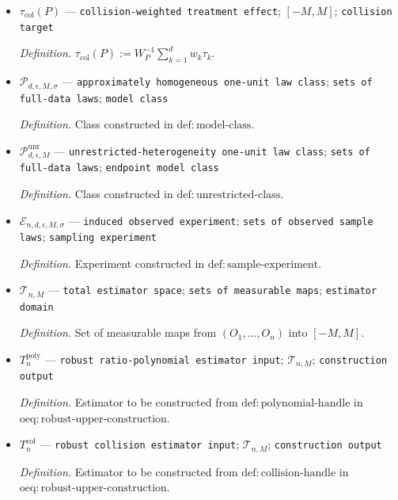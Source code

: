 \documentclass{article}
\begin{document}
\begin{itemize}
  \par\smallskip\noindent\emph{Definition.} \(W_P:=\sum_{k=1}^{d}w_k\).
  \item \(\tau_{\mathrm{col}}(P)\) --- \texttt{collision-\allowbreak{}weighted treatment effect}; \([-M,M]\); \texttt{collision target}
  \par\smallskip\noindent\emph{Definition.} \(\tau_{\mathrm{col}}(P):=W_P^{-1}\sum_{k=1}^{d}w_k\tau_k\).
  \item \(\mathcal P_{d,\epsilon,M,\sigma}\) --- \texttt{approximately homogeneous one-\allowbreak{}unit law class}; \texttt{sets of full-\allowbreak{}data laws}; \texttt{model class}
  \par\smallskip\noindent\emph{Definition.} Class constructed in \(\mathrm{def:model\text{-}class}\).
  \item \(\mathcal P_{d,\epsilon,M}^{\mathrm{unr}}\) --- \texttt{unrestricted-\allowbreak{}heterogeneity one-\allowbreak{}unit law class}; \texttt{sets of full-\allowbreak{}data laws}; \texttt{endpoint model class}
  \par\smallskip\noindent\emph{Definition.} Class constructed in \(\mathrm{def:unrestricted\text{-}class}\).
  \item \(\mathcal E_{n,d,\epsilon,M,\sigma}\) --- \texttt{induced observed experiment}; \texttt{sets of observed sample laws}; \texttt{sampling experiment}
  \par\smallskip\noindent\emph{Definition.} Experiment constructed in \(\mathrm{def:sample\text{-}experiment}\).
  \item \(\mathcal T_{n,M}\) --- \texttt{total estimator space}; \texttt{sets of measurable maps}; \texttt{estimator domain}
  \par\smallskip\noindent\emph{Definition.} Set of measurable maps from \((O_1,\ldots,O_n)\) into \([-M,M]\).
  \item \(T_n^{\mathrm{poly}}\) --- \texttt{robust ratio-\allowbreak{}polynomial estimator input}; \(\mathcal T_{n,M}\); \texttt{construction output}
  \par\smallskip\noindent\emph{Definition.} Estimator to be constructed from \(\mathrm{def:polynomial\text{-}handle}\) in \(\mathrm{oeq:robust\text{-}upper\text{-}construction}\).
  \item \(T_n^{\mathrm{col}}\) --- \texttt{robust collision estimator input}; \(\mathcal T_{n,M}\); \texttt{construction output}
  \par\smallskip\noindent\emph{Definition.} Estimator to be constructed from \(\mathrm{def:collision\text{-}handle}\) in \(\mathrm{oeq:robust\text{-}upper\text{-}construction}\).

\end{itemize}
\end{document}
